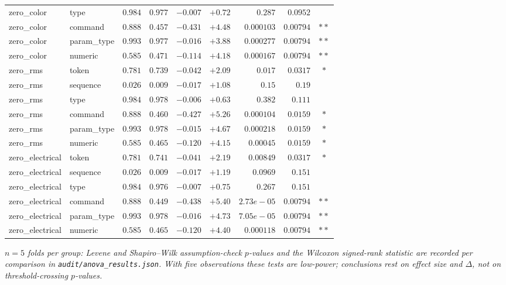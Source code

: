 \begin{table}[h]
\begin{tabular}{l l r r r r r r c}
zero\_color & type & $0.984$ & $0.977$ & $-0.007$ & $+0.72$ & $0.287$ & $0.0952$ &  \\
zero\_color & command & $0.888$ & $0.457$ & $-0.431$ & $+4.48$ & $0.000103$ & $0.00794$ & $\ast\ast$ \\
zero\_color & param\_type & $0.993$ & $0.977$ & $-0.016$ & $+3.88$ & $0.000277$ & $0.00794$ & $\ast\ast$ \\
zero\_color & numeric & $0.585$ & $0.471$ & $-0.114$ & $+4.18$ & $0.000167$ & $0.00794$ & $\ast\ast$ \\
zero\_rms & token & $0.781$ & $0.739$ & $-0.042$ & $+2.09$ & $0.017$ & $0.0317$ & $\ast$ \\
zero\_rms & sequence & $0.026$ & $0.009$ & $-0.017$ & $+1.08$ & $0.15$ & $0.19$ &  \\
zero\_rms & type & $0.984$ & $0.978$ & $-0.006$ & $+0.63$ & $0.382$ & $0.111$ &  \\
zero\_rms & command & $0.888$ & $0.460$ & $-0.427$ & $+5.26$ & $0.000104$ & $0.0159$ & $\ast$ \\
zero\_rms & param\_type & $0.993$ & $0.978$ & $-0.015$ & $+4.67$ & $0.000218$ & $0.0159$ & $\ast$ \\
zero\_rms & numeric & $0.585$ & $0.465$ & $-0.120$ & $+4.15$ & $0.00045$ & $0.0159$ & $\ast$ \\
zero\_electrical & token & $0.781$ & $0.741$ & $-0.041$ & $+2.19$ & $0.00849$ & $0.0317$ & $\ast$ \\
zero\_electrical & sequence & $0.026$ & $0.009$ & $-0.017$ & $+1.19$ & $0.0969$ & $0.151$ &  \\
zero\_electrical & type & $0.984$ & $0.976$ & $-0.007$ & $+0.75$ & $0.267$ & $0.151$ &  \\
zero\_electrical & command & $0.888$ & $0.449$ & $-0.438$ & $+5.40$ & $2.73e-05$ & $0.00794$ & $\ast\ast$ \\
zero\_electrical & param\_type & $0.993$ & $0.978$ & $-0.016$ & $+4.73$ & $7.05e-05$ & $0.00794$ & $\ast\ast$ \\
zero\_electrical & numeric & $0.585$ & $0.465$ & $-0.120$ & $+4.40$ & $0.000118$ & $0.00794$ & $\ast\ast$ \\
\bottomrule
\end{tabular}
\par\smallskip
\footnotesize\textit{$n=5$ folds per group: Levene and Shapiro--Wilk assumption-check $p$-values and the Wilcoxon signed-rank statistic are recorded per comparison in \texttt{audit/anova\_results.json}. With five observations these tests are low-power; conclusions rest on effect size and $\Delta$, not on threshold-crossing $p$-values.}
\end{table}